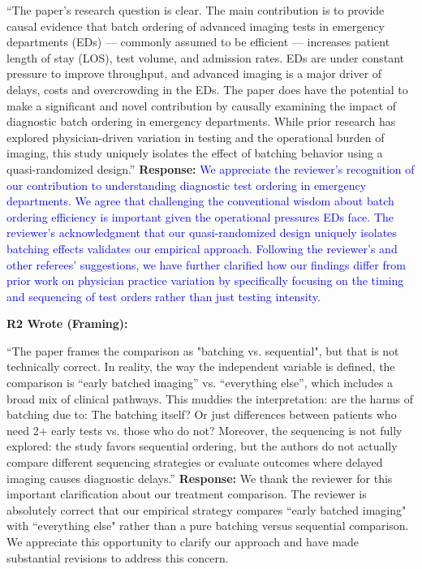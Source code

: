 \documentclass[11pt]{article}
\newenvironment{quote2}
{ \bigskip
\noindent
         \small\em
         \baselineskip=14pt
}
\newcommand{\1}{\hbox{\rm 1\kern-.35em 1}}
\begin{document}
{\begin{quote2}
\noindent``The paper’s research question is clear. The main contribution is to provide causal evidence that batch ordering of advanced imaging tests in emergency departments (EDs) — commonly assumed to be efficient — increases patient length of stay (LOS), test volume, and admission rates. EDs are under constant pressure to improve throughput, and advanced imaging is a major driver of delays, costs and overcrowding in the EDs. The paper does have the potential to make a significant and novel contribution by causally examining the impact of diagnostic batch ordering in emergency departments. While prior research has explored physician-driven variation in testing and the operational burden of imaging, this study uniquely isolates the effect of batching behavior using a quasi-randomized design.”
\end{quote2}

\noindent\textbf{Response:} \textcolor{blue}{We appreciate the reviewer's recognition of our contribution to understanding diagnostic test ordering in emergency departments. We agree that challenging the conventional wisdom about batch ordering efficiency is important given the operational pressures EDs face. The reviewer's acknowledgment that our quasi-randomized design uniquely isolates batching effects validates our empirical approach. Following the reviewer's and other referees' suggestions, we have further clarified how our findings differ from prior work on physician practice variation by specifically focusing on the timing and sequencing of test orders rather than just testing intensity.}

\begin{quote2}
\textbf{R2 Wrote (Framing):}  


\noindent``The paper frames the comparison as "batching vs. sequential", but that is not
technically correct. In reality, the way the independent variable is defined, the comparison is “early batched imaging” vs. “everything else”, which includes a broad mix
of clinical pathways. This muddies the interpretation: are the harms of batching due to:
The batching itself? Or just differences between patients who need 2+ early tests vs.
those who do not? Moreover, the sequencing is not fully explored: the study favors
sequential ordering, but the authors do not actually compare different sequencing
strategies or evaluate outcomes where delayed imaging causes diagnostic delays.”
\end{quote2}


\noindent\textbf{Response:} \color{blue}We thank the reviewer for this important clarification about our treatment comparison. The reviewer is absolutely correct that our empirical strategy compares ``early batched imaging" with ``everything else" rather than a pure batching versus sequential comparison. We appreciate this opportunity to clarify our approach and have made substantial revisions to address this concern.

}
\end{document}
